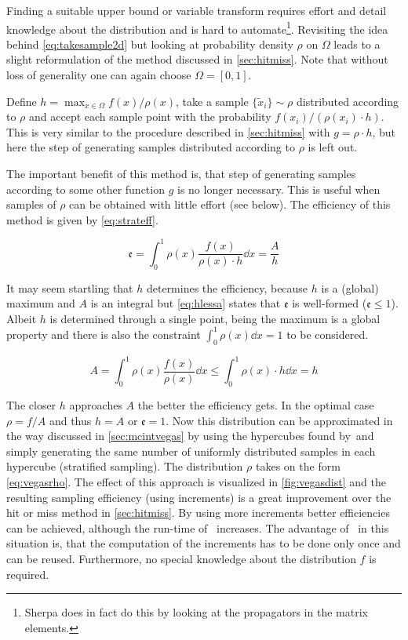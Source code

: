 Finding a suitable upper bound or variable transform requires effort
and detail knowledge about the distribution and is hard to
automate\footnote{Sherpa does in fact do this by looking at the
  propagators in the matrix elements.}.  Revisiting the idea
behind \cref{eq:takesample2d} but looking at probability density
\(\rho\) on \(\Omega\) leads to a slight reformulation of the method
discussed in \cref{sec:hitmiss}. Note that without loss of generality
one can again choose \(\Omega = [0, 1]\).

Define \(h=\max_{x\in\Omega}f(x)/\rho(x)\), take a sample
\(\{\tilde{x}_i\}\sim\rho\) distributed according to \(\rho\) and
accept each sample point with the probability
\(f(x_i)/(\rho(x_i)\cdot h)\).  This is very similar to the procedure
described in \cref{sec:hitmiss} with \(g=\rho\cdot h\), but here the
step of generating samples distributed according to \(\rho\) is left
out.

The important benefit of this method is, that step of generating
samples according to some other function \(g\) is no longer
necessary. This is useful when samples of \(\rho\) can be obtained
with little effort (see below). The efficiency of this method is given
by \cref{eq:strateff}.

\begin{equation}
  \label{eq:strateff}
  \mathfrak{e} = \int_0^1\rho(x)\frac{f(x)}{\rho(x)\cdot h}\dd{x} = \frac{A}{h}
\end{equation}

It may seem startling that \(h\) determines the efficiency, because
\(h\) is a (global) maximum and \(A\) is an integral
but \cref{eq:hlessa} states that \(\mathfrak{e}\) is well-formed
(\(\mathfrak{e}\leq 1\)). Albeit \(h\) is determined through a single
point, being the maximum is a global property and there is also the
constraint \(\int_0^1\rho(x)\dd{x}=1\) to be considered.

\begin{equation}
  \label{eq:hlessa}
  A = \int_0^1\rho(x)\frac{f(x)}{\rho(x)}\dd{x} \leq
  \int_0^1\rho(x)\cdot h\dd{x} = h
\end{equation}

The closer \(h\) approaches \(A\) the better the efficiency gets. In
the optimal case \(\rho=f/A\) and thus \(h=A\) or
\(\mathfrak{e} = 1\). Now this distribution can be approximated in the
way discussed in \cref{sec:mcintvegas} by using the hypercubes found
by~\vegas and simply generating the same number of uniformly
distributed samples in each hypercube (stratified sampling). The
distribution \(\rho\) takes on the form \cref{eq:vegasrho}. The
effect of this approach is visualized in \cref{fig:vegasdist} and the
resulting sampling efficiency  (using
 increments) is a great
improvement over the hit or miss method in \cref{sec:hitmiss}. By using
more increments better efficiencies can be achieved, although the
run-time of \vegas\ increases. The advantage of \vegas\ in this
situation is, that the computation of the increments has to be done
only once and can be reused. Furthermore, no special knowledge about
the distribution \(f\) is required.

